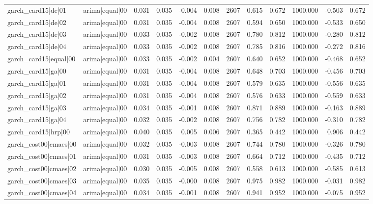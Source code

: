 \begin{table}
\begin{tabular}{llrrrrrrrrrr}
garch\_card15|de|01 & arima|equal|00 & 0.031 & 0.035 & -0.004 & 0.008 & 2607 & 0.615 & 0.672 & 1000.000 & -0.503 & 0.672 \\
garch\_card15|de|02 & arima|equal|00 & 0.031 & 0.035 & -0.004 & 0.008 & 2607 & 0.594 & 0.650 & 1000.000 & -0.533 & 0.650 \\
garch\_card15|de|03 & arima|equal|00 & 0.033 & 0.035 & -0.002 & 0.008 & 2607 & 0.780 & 0.812 & 1000.000 & -0.280 & 0.812 \\
garch\_card15|de|04 & arima|equal|00 & 0.033 & 0.035 & -0.002 & 0.008 & 2607 & 0.785 & 0.816 & 1000.000 & -0.272 & 0.816 \\
garch\_card15|equal|00 & arima|equal|00 & 0.033 & 0.035 & -0.002 & 0.004 & 2607 & 0.640 & 0.652 & 1000.000 & -0.468 & 0.652 \\
garch\_card15|ga|00 & arima|equal|00 & 0.031 & 0.035 & -0.004 & 0.008 & 2607 & 0.648 & 0.703 & 1000.000 & -0.456 & 0.703 \\
garch\_card15|ga|01 & arima|equal|00 & 0.031 & 0.035 & -0.004 & 0.008 & 2607 & 0.579 & 0.635 & 1000.000 & -0.556 & 0.635 \\
garch\_card15|ga|02 & arima|equal|00 & 0.031 & 0.035 & -0.004 & 0.008 & 2607 & 0.576 & 0.633 & 1000.000 & -0.559 & 0.633 \\
garch\_card15|ga|03 & arima|equal|00 & 0.034 & 0.035 & -0.001 & 0.008 & 2607 & 0.871 & 0.889 & 1000.000 & -0.163 & 0.889 \\
garch\_card15|ga|04 & arima|equal|00 & 0.032 & 0.035 & -0.002 & 0.008 & 2607 & 0.756 & 0.782 & 1000.000 & -0.310 & 0.782 \\
garch\_card15|hrp|00 & arima|equal|00 & 0.040 & 0.035 & 0.005 & 0.006 & 2607 & 0.365 & 0.442 & 1000.000 & 0.906 & 0.442 \\
garch\_cost00|cmaes|00 & arima|equal|00 & 0.032 & 0.035 & -0.003 & 0.008 & 2607 & 0.744 & 0.780 & 1000.000 & -0.326 & 0.780 \\
garch\_cost00|cmaes|01 & arima|equal|00 & 0.031 & 0.035 & -0.003 & 0.008 & 2607 & 0.664 & 0.712 & 1000.000 & -0.435 & 0.712 \\
garch\_cost00|cmaes|02 & arima|equal|00 & 0.030 & 0.035 & -0.005 & 0.008 & 2607 & 0.558 & 0.613 & 1000.000 & -0.585 & 0.613 \\
garch\_cost00|cmaes|03 & arima|equal|00 & 0.035 & 0.035 & -0.000 & 0.008 & 2607 & 0.975 & 0.982 & 1000.000 & -0.031 & 0.982 \\
garch\_cost00|cmaes|04 & arima|equal|00 & 0.034 & 0.035 & -0.001 & 0.008 & 2607 & 0.941 & 0.952 & 1000.000 & -0.075 & 0.952 \\

\end{tabular}
\end{table}
